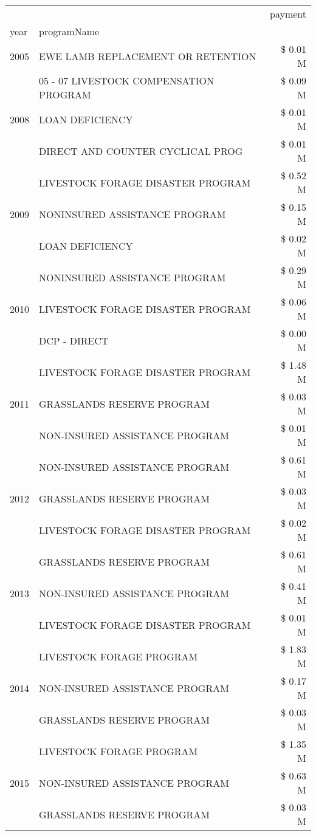 \begin{tabular}{llr}
\toprule
 &  & payment \\
year & programName &  \\
\midrule
2005 & EWE LAMB REPLACEMENT OR RETENTION & \$ 0.01 M \\
\cline{1-3}
\multirow[t]{3}{*}{2008} & 05 - 07 LIVESTOCK COMPENSATION PROGRAM & \$ 0.09 M \\
 & LOAN DEFICIENCY & \$ 0.01 M \\
 & DIRECT AND COUNTER CYCLICAL PROG & \$ 0.01 M \\
\cline{1-3}
\multirow[t]{3}{*}{2009} & LIVESTOCK FORAGE DISASTER  PROGRAM & \$ 0.52 M \\
 & NONINSURED ASSISTANCE PROGRAM & \$ 0.15 M \\
 & LOAN DEFICIENCY & \$ 0.02 M \\
\cline{1-3}
\multirow[t]{3}{*}{2010} & NONINSURED ASSISTANCE PROGRAM & \$ 0.29 M \\
 & LIVESTOCK FORAGE DISASTER PROGRAM & \$ 0.06 M \\
 & DCP - DIRECT & \$ 0.00 M \\
\cline{1-3}
\multirow[t]{3}{*}{2011} & LIVESTOCK FORAGE DISASTER PROGRAM & \$ 1.48 M \\
 & GRASSLANDS RESERVE PROGRAM & \$ 0.03 M \\
 & NON-INSURED ASSISTANCE PROGRAM & \$ 0.01 M \\
\cline{1-3}
\multirow[t]{3}{*}{2012} & NON-INSURED ASSISTANCE PROGRAM & \$ 0.61 M \\
 & GRASSLANDS RESERVE PROGRAM & \$ 0.03 M \\
 & LIVESTOCK FORAGE DISASTER PROGRAM & \$ 0.02 M \\
\cline{1-3}
\multirow[t]{3}{*}{2013} & GRASSLANDS RESERVE PROGRAM & \$ 0.61 M \\
 & NON-INSURED ASSISTANCE PROGRAM & \$ 0.41 M \\
 & LIVESTOCK FORAGE DISASTER PROGRAM & \$ 0.01 M \\
\cline{1-3}
\multirow[t]{3}{*}{2014} & LIVESTOCK FORAGE PROGRAM & \$ 1.83 M \\
 & NON-INSURED ASSISTANCE PROGRAM & \$ 0.17 M \\
 & GRASSLANDS RESERVE PROGRAM & \$ 0.03 M \\
\cline{1-3}
\multirow[t]{3}{*}{2015} & LIVESTOCK FORAGE PROGRAM & \$ 1.35 M \\
 & NON-INSURED ASSISTANCE PROGRAM & \$ 0.63 M \\
 & GRASSLANDS RESERVE PROGRAM & \$ 0.03 M \\

\end{tabular}
